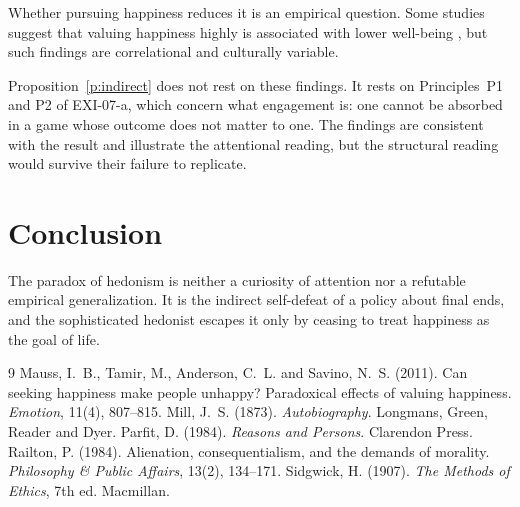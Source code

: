 \documentclass{situationist-preprint}
\begin{document}
\begin{objection}
Whether pursuing happiness reduces it is an empirical question. Some studies suggest that valuing happiness highly is associated with lower well-being \citep{Mauss2011}, but such findings are correlational and culturally variable.
\end{objection}

\begin{reply}
Proposition~\ref{p:indirect} does not rest on these findings. It rests on Principles~P1 and P2 of EXI-07-a, which concern what engagement is: one cannot be absorbed in a game whose outcome does not matter to one. The findings are consistent with the result and illustrate the attentional reading, but the structural reading would survive their failure to replicate.
\end{reply}

\section{Conclusion}

The paradox of hedonism is neither a curiosity of attention nor a refutable empirical generalization. It is the indirect self-defeat of a policy about final ends, and the sophisticated hedonist escapes it only by ceasing to treat happiness as the goal of life.

\begin{thebibliography}{9}\small
{} Mauss, I.~B., Tamir, M., Anderson, C.~L. and Savino, N.~S. (2011). Can seeking happiness make people unhappy? Paradoxical effects of valuing happiness. \emph{Emotion}, 11(4), 807--815.
 Mill, J.~S. (1873). \emph{Autobiography}. Longmans, Green, Reader and Dyer.
 Parfit, D. (1984). \emph{Reasons and Persons}. Clarendon Press.
 Railton, P. (1984). Alienation, consequentialism, and the demands of morality. \emph{Philosophy \& Public Affairs}, 13(2), 134--171.
 Sidgwick, H. (1907). \emph{The Methods of Ethics}, 7th ed. Macmillan.
\end{thebibliography}
\end{document}
